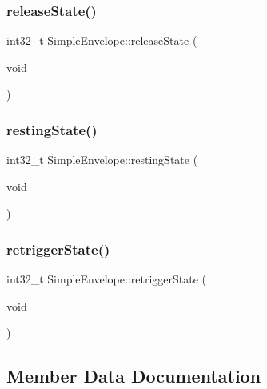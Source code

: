 \subsubsection{\texorpdfstring{release\+State()}{releaseState()}}
{\footnotesize\ttfamily int32\+\_\+t Simple\+Envelope\+::release\+State (\begin{DoxyParamCaption}\item[{void}]{ }\end{DoxyParamCaption})}

\mbox{\label{class_simple_envelope_a6d66b7278e15284e8dc996a73d7b042f}} 
\subsubsection{\texorpdfstring{resting\+State()}{restingState()}}
{\footnotesize\ttfamily int32\+\_\+t Simple\+Envelope\+::resting\+State (\begin{DoxyParamCaption}\item[{void}]{ }\end{DoxyParamCaption})}

\mbox{\label{class_simple_envelope_a2348516abb5eb0cd304ea70543b2e853}} 
\subsubsection{\texorpdfstring{retrigger\+State()}{retriggerState()}}
{\footnotesize\ttfamily int32\+\_\+t Simple\+Envelope\+::retrigger\+State (\begin{DoxyParamCaption}\item[{void}]{ }\end{DoxyParamCaption})}



\subsection{Member Data Documentation}
\mbox{\label{class_simple_envelope_acc118c5a74cb3373b48853916de74ce1}} 
